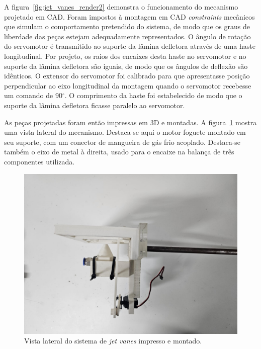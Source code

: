 A figura~\ref{fig:jet_vanes_render2} demonstra o funcionamento do mecanismo projetado em CAD\@. Foram impostos à montagem em CAD \textit{constraints} mecânicos que simulam o comportamento pretendido do sistema, de modo que os graus de liberdade das peças estejam adequadamente representados. O ângulo de rotação do servomotor é transmitido ao suporte da lâmina defletora através de uma haste longitudinal. Por projeto, os raios dos encaixes desta haste no servomotor e no suporte da lâmina defletora são iguais, de modo que os ângulos de deflexão são idênticos. O extensor do servomotor foi calibrado para que apresentasse posição perpendicular ao eixo longitudinal da montagem quando o servomotor recebesse um comando de \(90\mathrm{^\circ}\). O comprimento da haste foi estabelecido de modo que o suporte da lâmina defletora ficasse paralelo ao servomotor.


As peças projetadas foram então impressas em 3D e montadas. A figura~\ref{fig:jet_vanes_assembly_side} mostra uma vista lateral do mecanismo. Destaca-se aqui o motor foguete montado em seu suporte, com um conector de mangueira de gás frio acoplado. Destaca-se também o eixo de metal à direita, usado para o encaixe na balança de três componentes utilizada.

\begin{figure}[htbp]
    \centering
    \includegraphics[width=\textwidth]{img/tvc_assembly_left.jpeg}
    \caption{Vista lateral do sistema de \textit{jet vanes} impresso e montado.}\label{fig:jet_vanes_assembly_side}
\end{figure}


